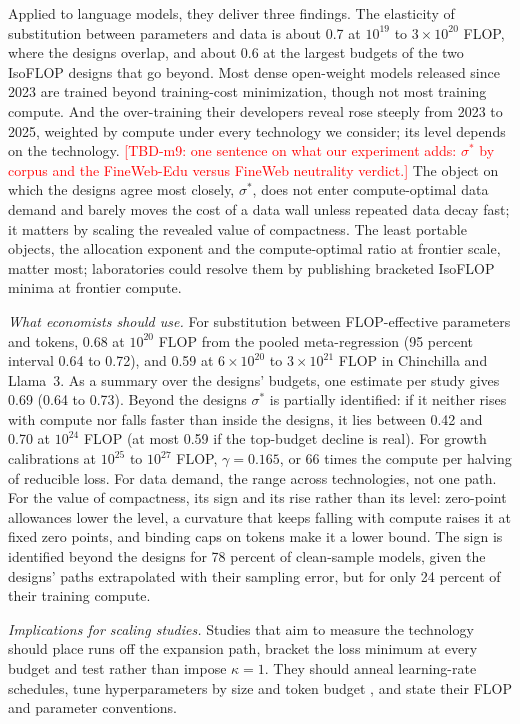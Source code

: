 Applied to language models, they deliver three findings. The elasticity of substitution between parameters and data is
about 0.7 at $10^{19}$ to $3\times10^{20}$ FLOP, where the designs overlap, and about 0.6 at the largest budgets of
the two IsoFLOP designs that go beyond. Most dense open-weight models released since 2023 are trained beyond
training-cost minimization, though not most training compute. And the over-training their developers reveal rose
steeply from 2023 to 2025, weighted by compute under every technology we consider; its level depends on the
technology. \textcolor{red}{[TBD-m9: one sentence on what our experiment adds: $\sigma^*$ by corpus and the
FineWeb-Edu versus FineWeb neutrality verdict.]} The object on which the designs agree most closely, $\sigma^*$, does
not enter compute-optimal data demand and barely moves the cost of a data wall unless repeated data decay fast; it
matters by scaling the revealed value of compactness. The least portable objects, the allocation exponent and the
compute-optimal ratio at frontier scale, matter most; laboratories could resolve them by publishing bracketed IsoFLOP
minima at frontier compute.

\textit{What economists should use.} For substitution between FLOP-effective parameters and tokens, 0.68 at $10^{20}$
FLOP from the pooled meta-regression (95 percent interval 0.64 to 0.72), and 0.59 at $6\times10^{20}$ to
$3\times10^{21}$ FLOP in Chinchilla and Llama~3. As a summary over the designs' budgets, one estimate per study gives
0.69 (0.64 to 0.73). Beyond the designs $\sigma^*$ is partially identified: if it neither rises with compute nor falls
faster than inside the designs, it lies between 0.42 and 0.70 at $10^{24}$ FLOP (at most 0.59 if the top-budget
decline is real). For growth calibrations at $10^{25}$ to $10^{27}$ FLOP, $\gamma=0.165$, or 66 times the compute per
halving of reducible loss. For data demand, the range across technologies, not one path. For the value of compactness,
its sign and its rise rather than its level: zero-point allowances lower the level, a curvature that keeps falling
with compute raises it at fixed zero points, and binding caps on tokens make it a lower bound. The sign is identified
beyond the designs for 78 percent of clean-sample models, given the designs' paths extrapolated with their sampling
error, but for only 24 percent of their training compute.

\textit{Implications for scaling studies.} Studies that aim to measure the technology should place runs off the
expansion path, bracket the loss minimum at every budget and test rather than impose $\kappa=1$. They should anneal
learning-rate schedules, tune hyperparameters by size and token budget
\citep{tissue2024scaling,bergsma2025power,lourie2026small}, and state their FLOP and parameter conventions.

